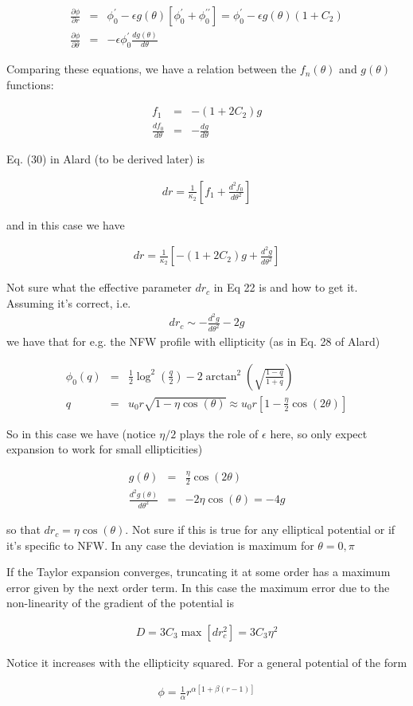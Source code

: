 \documentclass{article}
\def\bea{\begin{eqnarray}}
\def\eea{\end{eqnarray}}
\newcommand{\eps}{\epsilon}
\def \eps {\epsilon}
\def \te {\theta}
\def \pa {\partial}
\def \te {\theta}
\def \pa {\partial}
\begin{document}
\bea
\frac{\pa \phi}{\pa r}&=& \phi_0^\prime -%
  \eps g(\te)\left[\phi_0^\prime+ \phi_0^{\prime \prime}\right]=\phi_0^\prime-\eps g(\te)(1+C_2)\\
\frac{\pa \phi}{\pa \te}&=&-\eps\phi_0^\prime \frac{dg(\te)}{d\te}
\eea

Comparing these equations, we have a relation between the $f_n(\te)$ and $g(\te)$ functions:

\bea
f_1&=&-(1+2C_2)g \\
\frac{df_0}{d\theta}&=&-\frac{dg}{d\theta}
\eea

Eq. (30) in Alard (to be derived later) is

\bea
dr=\frac{1}{\kappa_2}\left[ f_1+\frac{d^2f_0}{d\theta^2} \right]
\eea

and in this case we have

\bea
dr=\frac{1}{\kappa_2}\left[ -(1+2C_2)g+\frac{d^2g}{d\theta^2} \right]
\eea

Not sure what the effective parameter $dr_c$  in Eq 22 is and how to get it.
Assuming it's correct, i.e.
\bea
dr_c\sim -\frac{d^2g}{d\te^2}-2g
\eea
we have that for e.g. the NFW profile with ellipticity (as in Eq. 28 of Alard)

\bea
\phi_0(q)&=&\frac{1}{2}\log^2\left(\frac{q}{2}\right)-2\arctan^2\left(\sqrt{\frac{1-q}{1+q}}\right) \\
q&=&u_0r\sqrt{1-\eta\cos(\theta)}\approx u_0 r \left[1-\frac{\eta}{2}\cos(2\theta)\right]
\eea

So in this case we have (notice $\eta/2$ plays the role of $\eps$ here, so only expect expansion to work 
for small ellipticities)

\bea
g(\te)&=&\frac{\eta}{2}\cos(2\theta) \\
\frac{d^2g(\te)}{d\te^2}&=&-2\eta\cos(\theta)=-4g
\eea

so that $dr_c=\eta\cos(\theta)$. Not sure if this is true for any elliptical potential or if it's specific to NFW.
In any case the deviation is maximum for $\te=0,\pi$

If the Taylor expansion converges, truncating it at some order has a maximum error given by the next order 
term. In this case the maximum error due to the non-linearity of the gradient of the potential is 

\bea
D=3C_3\max[dr_c^2]=3C_3\eta^2
\eea

Notice it increases with the ellipticity squared. For a general potential of the form

\bea
\phi=\frac{1}{\alpha}r^{\alpha[1+\beta(r-1)]}
\eea
\end{document}

